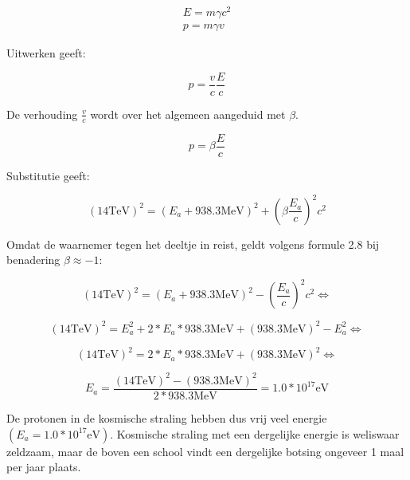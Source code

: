 \begin{equation}
\begin{array}{c}
E=m\gamma c^{2}\\
p=m\gamma v
\end{array}
\end{equation}


Uitwerken geeft:

\begin{equation}
p=\frac{v}{c}\frac{E}{c}
\end{equation}


De verhouding $\frac{v}{c}$ wordt over het algemeen aangeduid met
$\beta$.

\begin{equation}
p=\beta\frac{E}{c}
\end{equation}


Substitutie geeft:

\begin{equation}
\left(14\mathrm{TeV}\right)^{2}
=\left(E_{a}+938.3\mathrm{MeV}\right)^{2}+\left(\beta\frac{E_{a}}{c}\right)^{2}c^{2}
\end{equation}


Omdat de waarnemer tegen het deeltje in reist, geldt volgens formule
2.8 bij benadering $\beta\approx-1$:

\begin{equation}
\left(14\mathrm{TeV}\right)^{2}
=\left(E_{a}+938.3\mathrm{MeV}\right)^{2}-\left(\frac{E_{a}}{c}\right)^{2}c^{2}
\Longleftrightarrow
\end{equation}


\begin{equation}
\left(14\mathrm{TeV}\right)^{2}
=E_{a}^{2}+2*E_{a}*938.3\mathrm{MeV}+\left(938.3\mathrm{MeV}\right)^{2}-E_{a}^{2}
\Longleftrightarrow
\end{equation}


\begin{equation}
\left(14\mathrm{TeV}\right)^{2}
=2*E_{a}*938.3\mathrm{MeV}+\left(938.3\mathrm{MeV}\right)^{2}
\Longleftrightarrow
\end{equation}


\begin{equation}
E_{a}=\frac{\left(14\mathrm{TeV}\right)^{2}-\left(938.3\mathrm{MeV}\right)^{2}}{2*938.3\mathrm{MeV}}
=1.0*10^{17}\mathrm{eV}
\end{equation}


De protonen in de kosmische straling hebben dus vrij veel energie
$\left(E_{a}=1.0*10^{17}\mathrm{eV}\right)$. Kosmische straling met
een dergelijke energie is weliswaar zeldzaam, maar de boven een school
vindt een dergelijke botsing ongeveer 1 maal per jaar plaats.


